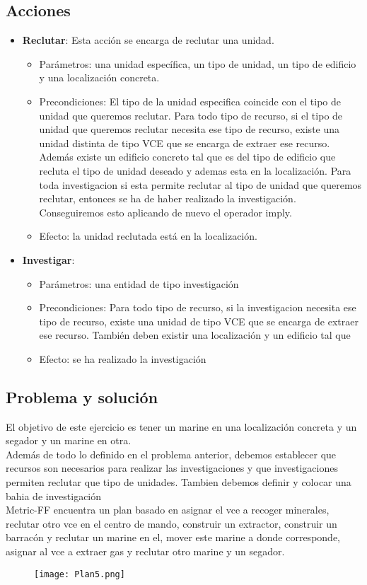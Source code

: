 \subsection{Acciones}
\begin{itemize}
   \item \textbf{Reclutar}: Esta acción se encarga de reclutar una unidad.
   \begin{itemize}
      \item Parámetros: una unidad específica, un tipo de unidad, un tipo de edificio y una localización concreta.
      \item Precondiciones: El tipo de la unidad especifica coincide con el tipo de unidad que queremos reclutar. Para todo tipo de recurso, si el tipo de unidad que queremos reclutar necesita ese tipo de recurso, existe una unidad distinta de tipo VCE que se encarga de extraer ese recurso. Además existe un edificio concreto tal que es del tipo de edificio que recluta el tipo de unidad deseado y ademas esta en la localización. Para toda investigacion si esta permite reclutar al tipo de unidad que queremos reclutar, entonces se ha de haber realizado la investigación. Conseguiremos esto aplicando de nuevo el operador imply.
      \item Efecto: la unidad reclutada está en la localización.
   \end{itemize}
   \item \textbf{Investigar}:
   \begin{itemize}
      \item Parámetros: una entidad de tipo investigación
      \item Precondiciones: Para todo tipo de recurso, si la investigacion necesita ese tipo de recurso, existe una unidad de tipo VCE que se encarga de extraer ese recurso. También deben existir una localización y un edificio tal que
      \item Efecto: se ha realizado la investigación
   \end{itemize}
\end{itemize}
\subsection{Problema y solución}
El objetivo de este ejercicio es tener un marine en una localización concreta y un segador y un marine en otra.\\
Además de todo lo definido en el problema anterior, debemos establecer que recursos son necesarios para realizar las investigaciones y que investigaciones permiten reclutar que tipo de unidades. Tambien debemos definir y colocar una bahia de investigación\\
Metric-FF encuentra un plan basado en asignar el vce a recoger minerales, reclutar otro vce en el centro de mando, construir un extractor, construir un barracón y reclutar un marine en el, mover este marine a donde corresponde, asignar al vce a extraer gas y reclutar otro marine y un segador.
\begin{figure}[H]
   \centering
   \texttt{[image: Plan5.png]}
\end{figure}


